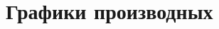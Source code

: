 \documentclass{article}
\begin{document}
	\section{Графики производных}
		\begin{figure}[h]
			\begin{minipage}[h]{0.47\linewidth}
				  \\
			\end{minipage}
			\hfill
			\begin{minipage}[h]{0.47\linewidth}
				 \\
			\end{minipage}
			\vfill
			\begin{minipage}[h]{0.47\linewidth}

\end{minipage}
\end{figure}
\end{document}
